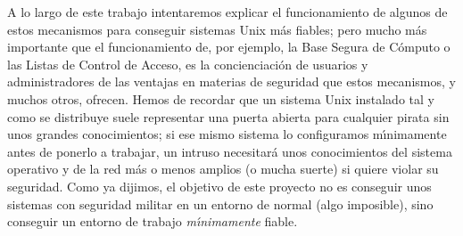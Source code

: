 A lo largo de este trabajo intentaremos explicar el funcionamiento de algunos
de estos mecanismos para conseguir sistemas Unix m\'as fiables; pero mucho m\'as
importante que el funcionamiento de, por ejemplo, la Base Segura de C\'omputo o
las Listas de Control de Acceso, es la concienciaci\'on de usuarios y 
administradores de las ventajas en materias de seguridad que estos mecanismos, y
muchos otros, ofrecen. Hemos de recordar que un sistema Unix instalado tal y
como se distribuye suele representar una puerta abierta para cualquier pirata
sin unos grandes conocimientos; si ese mismo sistema lo configuramos 
m\'{\i}nimamente antes de ponerlo a trabajar, un intruso necesitar\'a
unos conocimientos del sistema operativo y de la red m\'as o menos amplios (o
mucha suerte) si quiere violar su seguridad. Como ya dijimos, el objetivo de
este proyecto no es conseguir unos sistemas con seguridad militar en un entorno
de normal (algo imposible), sino conseguir un entorno de trabajo {\it 
m\'{\i}nimamente} fiable.
